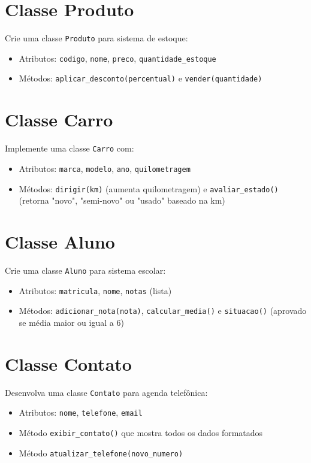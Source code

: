 \section{Classe Produto}
Crie uma classe \texttt{Produto} para sistema de estoque:
\begin{itemize}
    \item Atributos: \texttt{codigo}, \texttt{nome}, \texttt{preco}, \texttt{quantidade\_estoque}
    \item Métodos: \texttt{aplicar\_desconto(percentual)} e \texttt{vender(quantidade)}
\end{itemize}

\section{Classe Carro}
Implemente uma classe \texttt{Carro} com:
\begin{itemize}
    \item Atributos: \texttt{marca}, \texttt{modelo}, \texttt{ano}, \texttt{quilometragem}
    \item Métodos: \texttt{dirigir(km)} (aumenta quilometragem) e \texttt{avaliar\_estado()} (retorna "novo", "semi-novo" ou "usado" baseado na km)
\end{itemize}

\section{Classe Aluno}
Crie uma classe \texttt{Aluno} para sistema escolar:
\begin{itemize}
    \item Atributos: \texttt{matricula}, \texttt{nome}, \texttt{notas} (lista)
    \item Métodos: \texttt{adicionar\_nota(nota)}, \texttt{calcular\_media()} e \texttt{situacao()} (aprovado se média maior ou igual a 6)
\end{itemize}

\section{Classe Contato}
Desenvolva uma classe \texttt{Contato} para agenda telefônica:
\begin{itemize}
    \item Atributos: \texttt{nome}, \texttt{telefone}, \texttt{email}
    \item Método \texttt{exibir\_contato()} que mostra todos os dados formatados
    \item Método \texttt{atualizar\_telefone(novo\_numero)}
\end{itemize}

